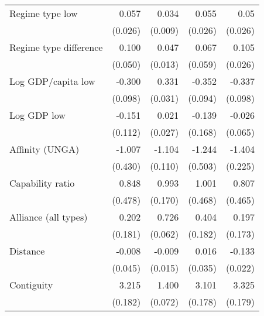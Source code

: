 \begin{table}[htbp]
\begin{tabular}{l*{4}{D{.}{.}{-1}}}
Regime type low&      0.057\sym{*}  &      0.034\sym{***}&      0.055\sym{*}  &      0.05\sym{+}  \\
   &     (0.026)         &     (0.009)         &     (0.026)         &     (0.026)         \\
\addlinespace
Regime type difference&       0.100\sym{*}  &      0.047\sym{***}&      0.067         &       0.105\sym{***}\\
   &     (0.050)         &     (0.013)         &     (0.059)         &     (0.026)         \\
\addlinespace
Log GDP/capita low&      -0.300\sym{**} &       0.331\sym{***}&      -0.352\sym{***}&      -0.337\sym{***}\\
   &     (0.098)         &     (0.031)         &     (0.094)         &     (0.098)         \\
\addlinespace
Log GDP low&      -0.151         &      0.021         &      -0.139         &     -0.026         \\
   &     (0.112)         &     (0.027)         &     (0.168)         &     (0.065)         \\
\addlinespace
Affinity (UNGA)&      -1.007\sym{*}  &      -1.104\sym{***}&      -1.244\sym{*}  &      -1.404\sym{***}\\
   &     (0.430)         &     (0.110)         &     (0.503)         &     (0.225)         \\
\addlinespace
Capability ratio&       0.848\sym{+}  &       0.993\sym{***}&       1.001\sym{*}  &       0.807\sym{+}  \\
   &     (0.478)         &     (0.170)         &     (0.468)         &     (0.465)         \\
\addlinespace
Alliance (all types)&       0.202         &       0.726\sym{***}&       0.404\sym{*}  &       0.197         \\
   &     (0.181)         &     (0.062)         &     (0.182)         &     (0.173)         \\
\addlinespace
Distance&    -0.008        &    -0.009         &      0.016         &      -0.133\sym{***}\\
   &     (0.045)         &     (0.015)         &     (0.035)         &     (0.022)         \\
\addlinespace
Contiguity&       3.215\sym{***}&       1.400\sym{***}&       3.101\sym{***}&       3.325\sym{***}\\
   &     (0.182)         &     (0.072)         &     (0.178)         &     (0.179)         \\

\end{tabular}
\end{table}

